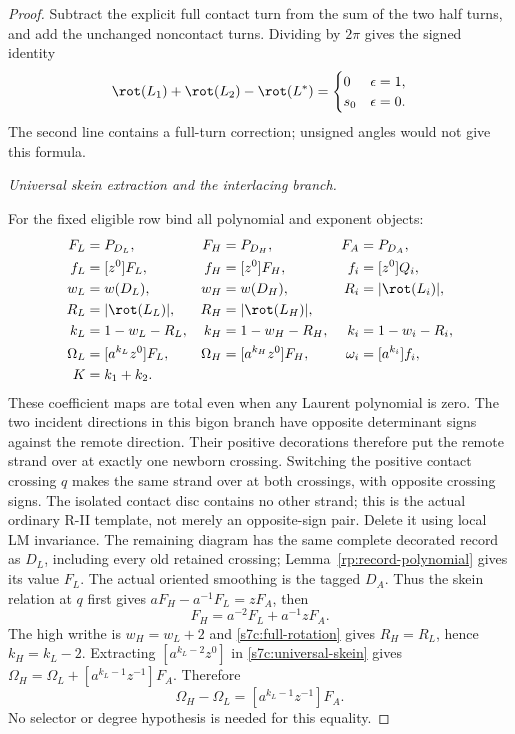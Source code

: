 \begin{proof}
Subtract the explicit full contact turn from the sum of the two half
turns, and add the unchanged noncontact turns.  Dividing by $2\pi$ gives
the signed identity
\begin{equation}\label{s7c:rotation-ledger}
 \rot(L_1)+\rot(L_2)-\rot(L^*)
 =\begin{cases}0&\epsilon=1,\\s_0&\epsilon=0.
 \end{cases}
\end{equation}
The second line contains a full-turn correction; unsigned angles would
not give this formula.

\par\medskip\noindent\emph{Universal skein extraction and the interlacing branch.}\par

For the fixed eligible row bind all polynomial and exponent objects:
\begin{align}
 F_L&=P_{D_L},&F_H&=P_{D_H},&F_A&=P_{D_A},\label{s7c:polynomial-binders}\\
 f_L&=[z^0]F_L,&f_H&=[z^0]F_H,&f_i&=[z^0]Q_i,\label{s7c:row-binders}\\
 w_L&=w(D_L),&w_H&=w(D_H),&R_i&=|\rot(L_i)|,\label{s7c:writhe-binders}\\
 R_L&=|\rot(L_L)|,&R_H&=|\rot(L_H)|,&&\label{s7c:rotation-binders}\\
 k_L&=1-w_L-R_L,&k_H&=1-w_H-R_H,&k_i&=1-w_i-R_i,\label{s7c:slot-binders}\\
 \Omega_L&=[a^{k_L}z^0]F_L,&\Omega_H&=[a^{k_H}z^0]F_H,
 &\omega_i&=[a^{k_i}]f_i,\label{s7c:coefficient-binders}\\
 K&=k_1+k_2.&&&&\label{s7c:product-slot}
\end{align}
These coefficient maps are total even when any Laurent polynomial is zero.
The two incident directions in this bigon branch have opposite
determinant signs against the remote direction. Their positive
decorations therefore put the remote strand over at exactly one
newborn crossing. Switching the positive contact crossing $q$ makes
the same strand over at both crossings, with opposite crossing signs.
The isolated contact disc contains no other strand; this is the actual
ordinary R-II template, not merely an opposite-sign pair. Delete it
using local LM invariance. The remaining diagram has the same complete
decorated record as $D_L$, including every old retained crossing;
Lemma~\ref{rp:record-polynomial} gives its value $F_L$. The actual
oriented smoothing is the tagged $D_A$. Thus the skein relation at $q$
first gives $aF_H-a^{-1}F_L=zF_A$, then
\begin{equation}\label{s7c:universal-skein}
 F_H=a^{-2}F_L+a^{-1}zF_A.
\end{equation}
The high writhe is $w_H=w_L+2$ and
\eqref{s7c:full-rotation} gives $R_H=R_L$, hence
$k_H=k_L-2$.  Extracting $[a^{k_L-2}z^0]$ in
\eqref{s7c:universal-skein} gives
$\Omega_H=\Omega_L+[a^{k_L-1}z^{-1}]F_A$.
Therefore
\begin{equation}\label{s7c:universal-extraction}
 \Omega_H-\Omega_L=[a^{k_L-1}z^{-1}]F_A.
\end{equation}
No selector or degree hypothesis is needed for this equality.


\end{proof}
